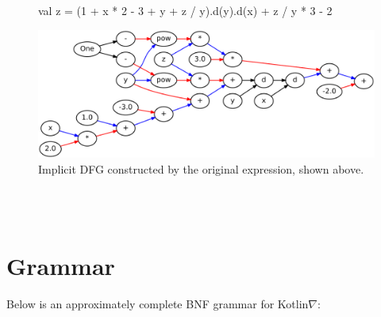 \documentclass[12pt,initial,twoside,maitrise]{dms}
\newcommand{\inline}[1]{%
    \begingroup%
    \sethlcolor{slightgray}%
    \hl{\ttfamily\footnotesize #1}%
    \endgroup
}
\numberwithin{equation}{section}
\numberwithin{table}{chapter}
\numberwithin{figure}{chapter}
\begin{document}
%
\begin{figure}
\begin{unbreakablekotlin}
val z = (1 + x * 2 - 3 + y + z / y).d(y).d(x) + z / y * 3 - 2
\end{unbreakablekotlin}
\end{figure}
\vspace{-40pt}
\begin{figure}
\centering
\includegraphics[scale=0.60]{../figures/dataflow.png}
\caption{Implicit DFG constructed by the original expression, shown above.}
\label{lst:edsl}
\end{figure}\\\\

\section{Grammar}

Below is an approximately complete BNF grammar for Kotlin$\nabla$:
\end{document}
